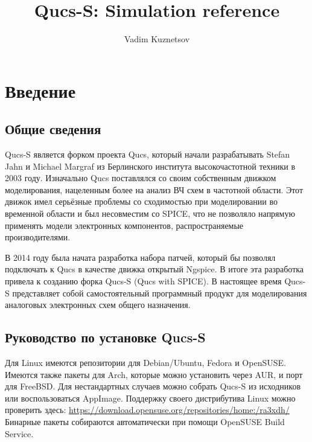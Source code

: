 \documentclass[a4paper,12pt]{article}
\title{Qucs-S: Simulation reference}
\author{Vadim Kuznetsov}
\begin{document}
\maketitle

\tableofcontents

\listoffigures

\listoftables



\clearpage
\section{Введение} \label{sec:intro}

\subsection{Общие сведения}

Qucs-S является форком проекта Qucs, который начали разрабатывать Stefan Jahn и Michael Margraf из Берлинского института высокочастотной техники в 2003 году. Изначально Qucs поставлялся со своим собственным движком моделирования, нацеленным более на анализ ВЧ схем в частотной области. Этот движок имел серьёзные проблемы со сходимостью при моделировании во временной области  и был несовместим со SPICE, что не позволяло напрямую применять модели электронных компонентов, распространяемые производителями.

В 2014 году была начата разработка набора патчей, который бы позволял подключать к Qucs в качестве движка открытый Ngspice. В итоге эта разработка привела к созданию форка Qucs-S (Qucs with SPICE). В настоящее время Qucs-S представляет собой самостоятельный программный продукт для моделирования аналоговых электронных схем общего назначения. 

\subsection{Руководство по установке Qucs-S}

Для Linux имеются репозитории для Debian/Ubuntu, Fedora и OpenSUSE. Имеются также пакеты для Arch, которые можно установить через AUR, и порт для FreeBSD. Для нестандартных случаев можно собрать Qucs-S из исходников или воспользоваться AppImage. Поддержку своего дистрибутива Linux можно проверить здесь:  \url{https://download.opensuse.org/repositories/home:/ra3xdh/} Бинарные пакеты собираются автоматически при помощи OpenSUSE Build Service. 
\end{document}
